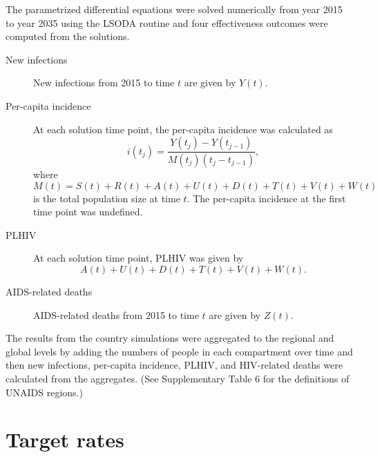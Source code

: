 \documentclass{article}
\begin{document}
The parametrized differential equations were solved numerically from
year 2015 to year 2035 using the LSODA routine\cite{odepack, scipy,
  medlock2016-git} and four effectiveness outcomes were computed from
the solutions.
\begin{description}
\item[New infections] New infections from 2015 to time $t$ are given
  by $Y(t)$.

\item[Per-capita incidence] At each solution time point, the
  per-capita incidence was calculated as
  \begin{equation}
    i(t_j) = \frac{Y(t_j) - Y(t_{j - 1})}{M(t_j) (t_j - t_{j - 1})},
  \end{equation}
  where
  \begin{equation}
    M(t) = S(t) + R(t) + A(t) + U(t) + D(t) + T(t) + V(t) + W(t)
  \end{equation}
  is the total population size at time $t$.  The per-capita incidence
  at the first time point was undefined.

\item[PLHIV] At each solution time point, PLHIV was given by
  \begin{equation}
    A(t) + U(t) + D(t) + T(t) + V(t) + W(t).
  \end{equation}

\item[AIDS-related deaths] AIDS-related deaths from 2015 to time $t$
  are given by $Z(t)$.

\end{description}

The results from the country simulations were aggregated to the
regional and global levels by adding the numbers of people in each
compartment over time and then new infections, per-capita incidence,
PLHIV, and HIV-related deaths were calculated from the aggregates.
(See Supplementary Table 6 for the definitions of UNAIDS regions.)


\section{Target rates}
\label{targets}
\end{document}

